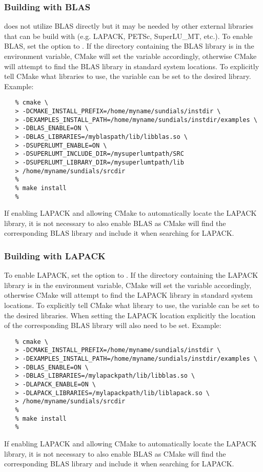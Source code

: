 \subsubsection*{Building with BLAS}
{\sundials} does not utilize BLAS directly but it may be needed by other
external libraries that {\sundials} can be build with (e.g. LAPACK,
PETSc, SuperLU\_MT, etc.). To enable BLAS, set the 
option to . If the directory containing the BLAS library is in
the  environment variable, CMake will set the
 variable accordingly, otherwise CMake will
attempt to find the BLAS library in standard system locations. To
explicitly tell CMake what libraries to use, the 
variable can be set to the desired library. Example:
\begin{verbatim}
   % cmake \
   > -DCMAKE_INSTALL_PREFIX=/home/myname/sundials/instdir \
   > -DEXAMPLES_INSTALL_PATH=/home/myname/sundials/instdir/examples \
   > -DBLAS_ENABLE=ON \
   > -DBLAS_LIBRARIES=/myblaspath/lib/libblas.so \
   > -DSUPERLUMT_ENABLE=ON \
   > -DSUPERLUMT_INCLUDE_DIR=/mysuperlumtpath/SRC
   > -DSUPERLUMT_LIBRARY_DIR=/mysuperlumtpath/lib
   > /home/myname/sundials/srcdir
   %
   % make install
   % 
\end{verbatim}
{\warn}If enabling LAPACK and allowing CMake to automatically locate
the LAPACK library, it is not necessary to also enable BLAS as CMake
will find the corresponding BLAS library and include it when searching
for LAPACK.


\subsubsection*{Building with LAPACK}
To enable LAPACK, set the \id{LAPACK\_ENABLE} option to \id{ON}.
If the directory containing the LAPACK library is in the
 environment variable, CMake will set the
 variable accordingly, otherwise CMake will
attempt to find the LAPACK library in standard system locations. To
explicitly tell CMake what library to use, the 
variable can be set to the desired libraries. {\warn}When setting
the LAPACK location explicitly the location of the corresponding BLAS
library will also need to be set. Example:
\begin{verbatim}
   % cmake \
   > -DCMAKE_INSTALL_PREFIX=/home/myname/sundials/instdir \
   > -DEXAMPLES_INSTALL_PATH=/home/myname/sundials/instdir/examples \
   > -DBLAS_ENABLE=ON \
   > -DBLAS_LIBRARIES=/mylapackpath/lib/libblas.so \
   > -DLAPACK_ENABLE=ON \
   > -DLAPACK_LIBRARIES=/mylapackpath/lib/liblapack.so \
   > /home/myname/sundials/srcdir
   %
   % make install
   % 
\end{verbatim}
{\warn}If enabling LAPACK and allowing CMake to automatically locate
the LAPACK library, it is not necessary to also enable BLAS as CMake
will find the corresponding BLAS library and include it when searching
for LAPACK.


